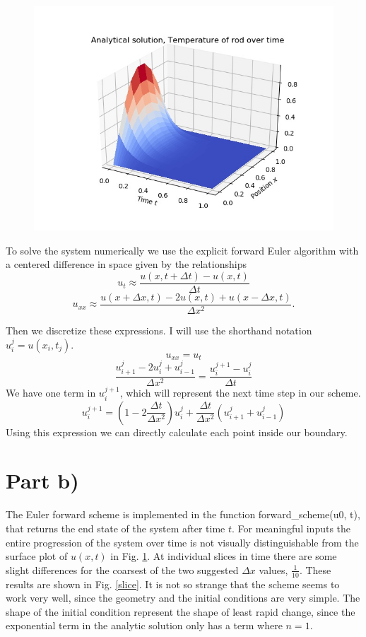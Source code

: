\documentclass[10pt,a4paper]{article}
\begin{document}
\begin{figure}[!ht]
	
	\begin{center}
		\includegraphics[width=\textwidth]{surface_plot.jpg}
	\end{center}
	\label{surface}
	
\end{figure}

To solve the system numerically we use the explicit forward Euler algorithm with a centered difference in space given by the relationships
\[u_t \approx \frac{u(x,t+\Delta t) - u(x,t)}{\Delta t}\]
\[u_{xx} \approx \frac{u(x + \Delta x,t) - 2u(x,t) + u(x - \Delta x,t)}{\Delta x^2}.\]

Then we discretize these expressions. I will use the shorthand notation $u_i^j= u(x_i, t_j)$. 
\[u_{xx} = u_{t}\]
\[\frac{u_{i+1}^j - 2u_i^j + u_{i-1}^j}{\Delta x^2} = \frac{u_i^{j+1} - u_i^j}{\Delta t}\]
We have one term in $u_i^{j+1}$, which will represent the next time step in our scheme.
\[u_i^{j+1} = \left(1 - 2\frac{\Delta t}{\Delta x^2}\right) u_i^j + \frac{\Delta t}{\Delta x^2} \left(u_{i+1}^j + u_{i-1}^j\right)\]
 Using this expression we can directly calculate each point inside our boundary. 

\section*{Part b)}

The Euler forward scheme is implemented in the function forward\_scheme(u0, t), that returns the end state of the system after time $t$. For meaningful inputs the entire progression of the system over time is not visually distinguishable from the surface plot of $u(x,t)$ in Fig. \ref{surface}. At individual slices in time there are some slight differences for the coarsest of the two suggested $\Delta x$ values, $\frac{1}{10}$. These results are shown in Fig. \ref{slice}. It is not so strange that the scheme seems to work very well, since the geometry and the initial conditions are very simple. The shape of the initial condition represent the shape of least rapid change, since the exponential term in the analytic solution only has a term where $n=1$.
\end{document}
